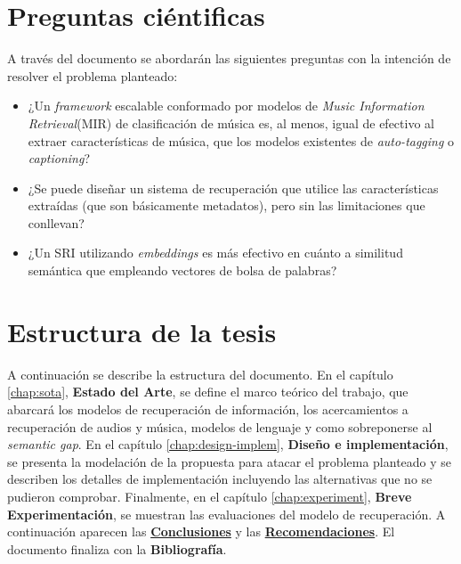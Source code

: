 \section{Preguntas ciéntificas}
\label{sec:questions}
A través del documento se abordarán las siguientes preguntas con la intención de resolver el problema planteado:
\begin{itemize}
    \item ¿Un \textit{framework} escalable conformado por modelos de \textit{Music Information Retrieval}(MIR) de clasificación de música es, al menos, igual de efectivo al extraer características de música, que los modelos existentes de \textit{auto-tagging} o \textit{captioning}?
    \item ¿Se puede diseñar un sistema de recuperación que utilice las características extraídas (que son básicamente metadatos), pero sin las limitaciones que conllevan?  %
    \item ¿Un SRI utilizando \textit{embeddings} es más efectivo en cuánto a similitud semántica que empleando vectores de bolsa de palabras? %
\end{itemize}

\section{Estructura de la tesis}
\label{sec:structure}

A continuación se describe la estructura del documento.  En el capítulo \ref{chap:sota}, \textbf{Estado del Arte}, se define el marco teórico del trabajo, que abarcará los modelos de recuperación de información, los acercamientos a recuperación de audios y música, modelos de lenguaje y como sobreponerse al \textit{semantic gap}. En el capítulo \ref{chap:design-implem}, \textbf{Diseño e implementación}, se presenta la modelación de la propuesta para atacar el problema planteado y se describen los detalles de implementación incluyendo las alternativas que no se pudieron comprobar. Finalmente, en el capítulo \ref{chap:experiment}, \textbf{Breve Experimentación}, se muestran las evaluaciones del modelo de recuperación. A continuación aparecen las \hyperref[chap:conclusions]{\textbf{Conclusiones}} y las \hyperref[chap:recommendations]{\textbf{Recomendaciones}}. El documento finaliza con la \textbf{Bibliografía}.
